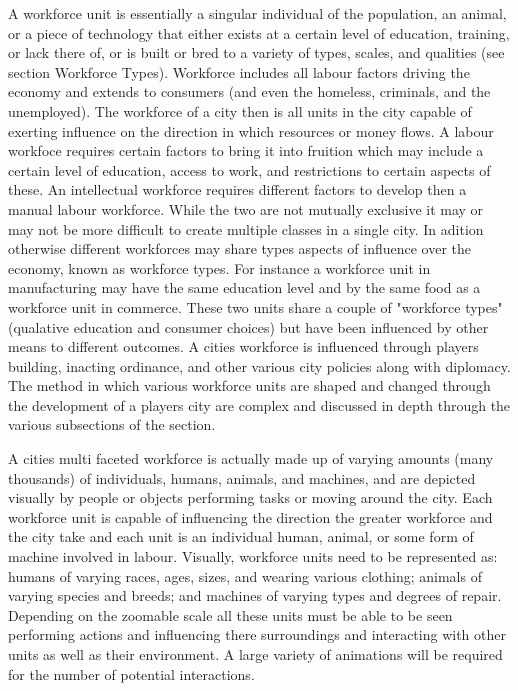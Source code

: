 A workforce unit is essentially a singular individual of the population, an animal, or a piece of technology that either exists at a certain level of education, training, or lack there of, or is built or bred to a variety of types, scales, and qualities (see section Workforce Types). Workforce includes all labour factors driving the economy and extends to consumers (and even the homeless, criminals, and the unemployed). The workforce of a city then is all units in the city capable of exerting influence on the direction in which resources or money flows. A labour workfoce requires certain factors to bring it into fruition which may include a certain level of education, access to work, and restrictions to certain aspects of these. An intellectual workforce requires different factors to develop then a manual labour workforce. While the two are not mutually exclusive it may or may not be more difficult to create multiple classes in a single city. In adition otherwise different workforces may share types aspects of influence over the economy, known as workforce types. For instance a workforce unit in manufacturing may have the same education level and by the same food as a workforce unit in commerce. These two units share a couple of "workforce types" (qualative education and consumer choices) but have been influenced by other means to different outcomes. A cities workforce is influenced through players building, inacting ordinance, and other various city policies along with diplomacy. The method in which various workforce units are shaped and changed through the development of a players city are complex and discussed in depth through the various subsections of the section.

A cities multi faceted workforce is actually made up of varying amounts (many thousands) of individuals, humans, animals, and machines, and are depicted visually by people or objects performing tasks or moving around the city. Each workforce unit is capable of influencing the direction the greater workforce and the city take and each unit is an individual human, animal, or some form of machine involved in labour. Visually, workforce units need to be represented as: humans of varying races, ages, sizes, and wearing various clothing; animals of varying species and breeds; and machines of varying types and degrees of repair. Depending on the zoomable scale all these units must be able to be seen performing actions and influencing there surroundings and interacting with other units as well as their environment. A large variety of animations will be required for the number of potential interactions. 

